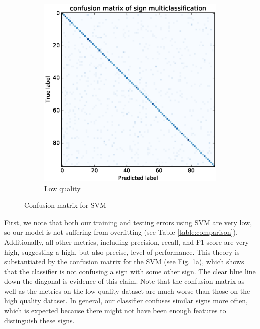 \documentclass[twocolumn]{article}
\begin{document}
\begin{figure}[t]
\begin{subfigure}[b]{0.48\linewidth}
        \includegraphics[trim=100 22 80 39, clip,width=1.0\linewidth]{results/svm_low_quality_confusion}
        \caption{Low quality}
\end{subfigure}%
\vspace{-2mm}
\caption{Confusion matrix for SVM}
\label{fig:confusion_matrix_svm}
\end{figure}

First, we note that both our training and testing errors using SVM are very low, so our model is not suffering from overfitting (see Table \ref{table:comparison}). Additionally, all other metrics, including precision, recall, and F1 score are very high, suggesting a high, but also precise, level of performance. This theory is substantiated by the confusion matrix for the SVM (see Fig. \ref{fig:confusion_matrix_svm}a), which shows that the classifier is not confusing a sign with some other sign. The clear blue line down the diagonal is evidence of this claim. Note that the confusion matrix as well as the metrics on the low quality dataset are much worse than those on the high quality dataset. In general, our classifier confuses similar signs more often, which is expected because there might not have been enough features to distinguish these signs.
\end{document}
